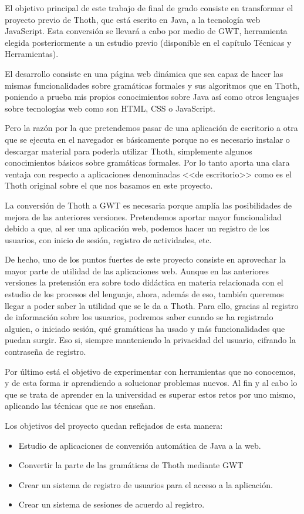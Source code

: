 
El objetivo principal de este trabajo de final de grado consiste en transformar el proyecto previo de Thoth, que está escrito en Java, a la tecnología web JavaScript. Esta conversión se llevará a cabo por medio de GWT, herramienta elegida posteriormente a un estudio previo (disponible en el capítulo Técnicas y Herramientas). 

El desarrollo consiste en una página web dinámica que sea capaz de hacer las mismas funcionalidades sobre gramáticas formales y sus algoritmos que en Thoth, poniendo a prueba mis propios conocimientos sobre Java así como otros lenguajes sobre tecnologías web como son HTML, CSS o JavaScript.

Pero la razón por la que pretendemos pasar de una aplicación de escritorio a otra que se ejecuta en el navegador es básicamente porque no es necesario instalar o descargar material para poderla utilizar Thoth, simplemente algunos conocimientos básicos sobre gramáticas formales. Por lo tanto aporta una clara ventaja con respecto a aplicaciones denominadas <<de escritorio>> como es el Thoth original sobre el que nos basamos en este proyecto.

La conversión de Thoth a GWT es necesaria porque amplía las posibilidades de mejora de las anteriores versiones. Pretendemos aportar mayor funcionalidad debido a que, al ser una aplicación web, podemos hacer un registro de los usuarios, con inicio de sesión, registro de actividades, etc. 

De hecho, uno de los puntos fuertes de este proyecto consiste en aprovechar la mayor parte de utilidad de las aplicaciones web. Aunque en las anteriores versiones la pretensión era sobre todo didáctica en materia relacionada con el estudio de los procesos del lenguaje, ahora, además de eso, también queremos llegar a poder saber la utilidad que se le da a Thoth. Para ello, gracias al registro de información sobre los usuarios, podremos saber cuando se ha registrado alguien, o iniciado sesión, qué gramáticas ha usado y más funcionalidades que puedan surgir. Eso si, siempre manteniendo la privacidad del usuario, cifrando la contraseña de registro.

Por último está el objetivo de experimentar con herramientas que no conocemos, y de esta forma ir aprendiendo a solucionar problemas nuevos. Al fin y al cabo lo que se trata de aprender en la universidad es superar estos retos por uno mismo, aplicando las técnicas que se nos enseñan.

Los objetivos del proyecto quedan reflejados de esta manera:

\begin{itemize}

\item Estudio de aplicaciones de conversión automática de Java a la web.
\item Convertir la parte de las gramáticas de Thoth mediante GWT
\item Crear un sistema de registro de usuarios para el acceso a la aplicación.
\item Crear un sistema de sesiones de acuerdo al registro.

\end{itemize}
